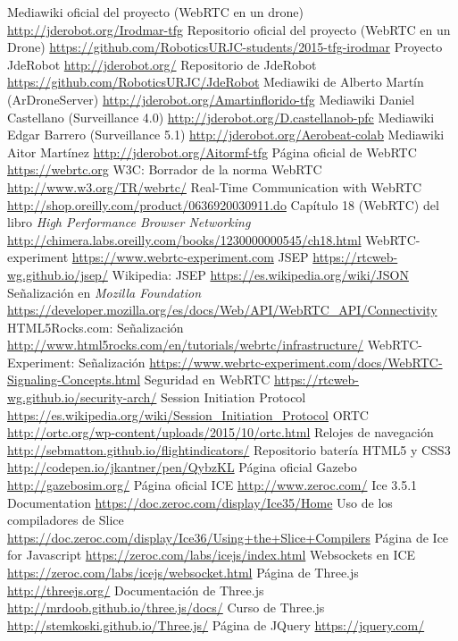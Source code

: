\documentclass[oneside,a4paper,12pt]{book}
\begin{document}
\begin{thebibliography}{99}

 Mediawiki oficial del proyecto (WebRTC en un drone) \url{http://jderobot.org/Irodmar-tfg}
 Repositorio oficial del proyecto (WebRTC en un Drone) \url{https://github.com/RoboticsURJC-students/2015-tfg-irodmar} 
 Proyecto JdeRobot \url{http://jderobot.org/} 
 Repositorio de JdeRobot \url{https://github.com/RoboticsURJC/JdeRobot} 
 Mediawiki de Alberto Martín (ArDroneServer) \url{http://jderobot.org/Amartinflorido-tfg}
 Mediawiki Daniel Castellano (Surveillance 4.0) \url{http://jderobot.org/D.castellanob-pfc} 
 Mediawiki Edgar Barrero (Surveillance 5.1) \url{http://jderobot.org/Aerobeat-colab}
 Mediawiki Aitor Martínez \url{http://jderobot.org/Aitormf-tfg}
 Página oficial de WebRTC \url{https://webrtc.org}
 W3C: Borrador de la norma WebRTC \url{http://www.w3.org/TR/webrtc/}
 Real-Time Communication with WebRTC \url{http://shop.oreilly.com/product/0636920030911.do}
 Capítulo 18 (WebRTC) del libro \emph{High Performance Browser Networking} \url{http://chimera.labs.oreilly.com/books/1230000000545/ch18.html}
 WebRTC-experiment \url{https://www.webrtc-experiment.com}
 JSEP  \url{https://rtcweb-wg.github.io/jsep/}
 Wikipedia: JSEP  \url{https://es.wikipedia.org/wiki/JSON}
 Señalización en \emph{Mozilla Foundation} \url{https://developer.mozilla.org/es/docs/Web/API/WebRTC_API/Connectivity}
 HTML5Rocks.com: Señalización \url{http://www.html5rocks.com/en/tutorials/webrtc/infrastructure/}
 WebRTC-Experiment: Señalización \url{https://www.webrtc-experiment.com/docs/WebRTC-Signaling-Concepts.html}
 Seguridad en WebRTC \url{https://rtcweb-wg.github.io/security-arch/}
 Session Initiation Protocol \url{https://es.wikipedia.org/wiki/Session_Initiation_Protocol}
 ORTC \url{http://ortc.org/wp-content/uploads/2015/10/ortc.html}
 Relojes de navegación \url{http://sebmatton.github.io/flightindicators/}
 Repositorio batería HTML5 y CSS3 \url{http://codepen.io/jkantner/pen/QybzKL}
 Página oficial Gazebo \url{http://gazebosim.org/}
 Página oficial ICE  \url{http://www.zeroc.com/}
Ice 3.5.1 Documentation  \url{https://doc.zeroc.com/display/Ice35/Home}
 Uso de los compiladores de Slice \url{https://doc.zeroc.com/display/Ice36/Using+the+Slice+Compilers}
 Página de Ice for Javascript  \url{https://zeroc.com/labs/icejs/index.html}
 Websockets en ICE \url{https://zeroc.com/labs/icejs/websocket.html}
 Página de Three.js \url{http://threejs.org/}
 Documentación de Three.js \url{http://mrdoob.github.io/three.js/docs/}
 Curso de Three.js \url{http://stemkoski.github.io/Three.js/}
 Página de JQuery \url{https://jquery.com/}

\end{thebibliography} 
\end{document}
